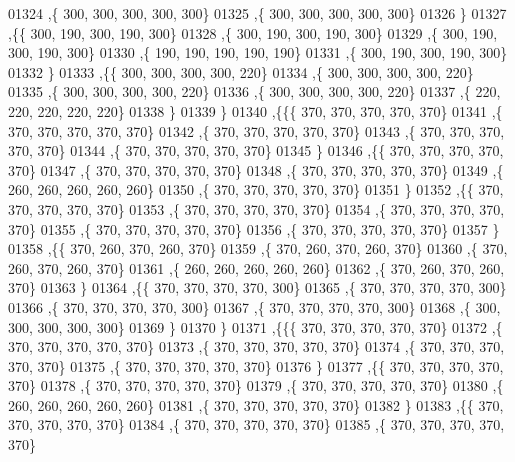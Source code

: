 \begin{DoxyCode}
01324    ,\{   300,   300,   300,   300,   300\}
01325    ,\{   300,   300,   300,   300,   300\}
01326    \}
01327   ,\{\{   300,   190,   300,   190,   300\}
01328    ,\{   300,   190,   300,   190,   300\}
01329    ,\{   300,   190,   300,   190,   300\}
01330    ,\{   190,   190,   190,   190,   190\}
01331    ,\{   300,   190,   300,   190,   300\}
01332    \}
01333   ,\{\{   300,   300,   300,   300,   220\}
01334    ,\{   300,   300,   300,   300,   220\}
01335    ,\{   300,   300,   300,   300,   220\}
01336    ,\{   300,   300,   300,   300,   220\}
01337    ,\{   220,   220,   220,   220,   220\}
01338    \}
01339   \}
01340  ,\{\{\{   370,   370,   370,   370,   370\}
01341    ,\{   370,   370,   370,   370,   370\}
01342    ,\{   370,   370,   370,   370,   370\}
01343    ,\{   370,   370,   370,   370,   370\}
01344    ,\{   370,   370,   370,   370,   370\}
01345    \}
01346   ,\{\{   370,   370,   370,   370,   370\}
01347    ,\{   370,   370,   370,   370,   370\}
01348    ,\{   370,   370,   370,   370,   370\}
01349    ,\{   260,   260,   260,   260,   260\}
01350    ,\{   370,   370,   370,   370,   370\}
01351    \}
01352   ,\{\{   370,   370,   370,   370,   370\}
01353    ,\{   370,   370,   370,   370,   370\}
01354    ,\{   370,   370,   370,   370,   370\}
01355    ,\{   370,   370,   370,   370,   370\}
01356    ,\{   370,   370,   370,   370,   370\}
01357    \}
01358   ,\{\{   370,   260,   370,   260,   370\}
01359    ,\{   370,   260,   370,   260,   370\}
01360    ,\{   370,   260,   370,   260,   370\}
01361    ,\{   260,   260,   260,   260,   260\}
01362    ,\{   370,   260,   370,   260,   370\}
01363    \}
01364   ,\{\{   370,   370,   370,   370,   300\}
01365    ,\{   370,   370,   370,   370,   300\}
01366    ,\{   370,   370,   370,   370,   300\}
01367    ,\{   370,   370,   370,   370,   300\}
01368    ,\{   300,   300,   300,   300,   300\}
01369    \}
01370   \}
01371  ,\{\{\{   370,   370,   370,   370,   370\}
01372    ,\{   370,   370,   370,   370,   370\}
01373    ,\{   370,   370,   370,   370,   370\}
01374    ,\{   370,   370,   370,   370,   370\}
01375    ,\{   370,   370,   370,   370,   370\}
01376    \}
01377   ,\{\{   370,   370,   370,   370,   370\}
01378    ,\{   370,   370,   370,   370,   370\}
01379    ,\{   370,   370,   370,   370,   370\}
01380    ,\{   260,   260,   260,   260,   260\}
01381    ,\{   370,   370,   370,   370,   370\}
01382    \}
01383   ,\{\{   370,   370,   370,   370,   370\}
01384    ,\{   370,   370,   370,   370,   370\}
01385    ,\{   370,   370,   370,   370,   370\}

\end{DoxyCode}

